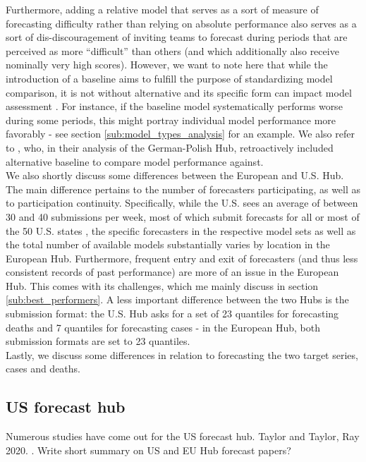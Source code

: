 Furthermore, adding a relative model that serves as a sort of measure of forecasting difficulty rather than relying on absolute performance also serves as a sort of dis-discouragement of inviting teams to forecast during periods that are perceived as more ``difficult'' than others (and which additionally also receive nominally very high scores). However, we want to note here that while the introduction of a baseline aims to fulfill the purpose of standardizing model comparison, it is not without alternative and its specific form can imp{}act model assessment \citep{sherratt_predictive_2022}. For instance, if the baseline model systematically performs worse during some periods, this might portray individual model performance more favorably - see section \ref{sub:model_types_analysis} for an example. We also refer to \cite{bracher_pre-registered_2021}, who, in their analysis of the German-Polish Hub, retroactively included alternative baseline to compare model performance against.\\
We also shortly discuss some differences between the European and U.S. Hub. The main difference pertains to the number of forecasters participating, as well as to participation continuity. Specifically, while the U.S. sees an average of between 30 and 40 submissions per week, most of which submit forecasts for all or most of the 50 U.S. states \citep{ray_comparing_2022}, the specific forecasters in the respective model sets as well as the total number of available models substantially varies by location in the European Hub. Furthermore, frequent entry and exit of forecasters (and thus less consistent records of past performance) are more of an issue in the European Hub. This comes with its challenges, which me mainly discuss in section \ref{sub:best_performers}. A less important difference between the two Hubs is the submission format: the U.S. Hub asks for a set of 23 quantiles for forecasting deaths and 7 quantiles for forecasting cases - in the European Hub, both submission formats are set to 23 quantiles.\\
Lastly, we discuss some differences in relation to forecasting the two target series, cases and deaths.\\
\subsection{US forecast hub}
Numerous studies have come out for the US forecast hub. Taylor and Taylor, Ray 2020. \cite{ray_ensemble_2020}. Write short summary on US and EU Hub forecast papers?\\
